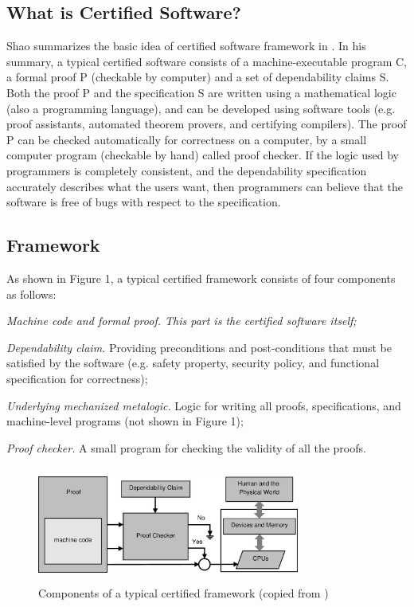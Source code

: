\documentclass[10pt, conference, compsocconf]{IEEEtran}
\begin{document}
\subsection{What is Certified Software?}

Shao summarizes the basic idea of certified software framework in \cite{shao}. In his summary, a typical certified software consists of a machine-executable program C, a formal proof P (checkable by computer) and a set of dependability claims S. Both the proof P and the specification S are written using a mathematical logic (also a programming language), and can be developed using software tools (e.g. proof assistants, automated theorem provers, and certifying compilers). The proof P can be checked automatically for correctness on a computer, by a small computer program (checkable by hand) called proof checker. If the logic used by programmers is completely consistent, and the dependability specification accurately describes what the users want, then programmers can believe that the software is free of bugs with respect to the specification.

\subsection{Framework}

As shown in Figure 1, a typical certified framework consists of four components as follows:

\emph{Machine code and formal proof. This part is the certified software itself;}

\emph{Dependability claim.} Providing preconditions and post-conditions that must be satisfied by the software (e.g. safety property, security policy, and functional specification for correctness);

\emph{Underlying mechanized metalogic.} Logic for writing all proofs, specifications, and machine-level programs (not shown in Figure 1);

\emph{Proof checker.} A small program for checking the validity of all the proofs.

	\begin{figure}[H]
	\centering
	\includegraphics[height=1.5in ,width=3.4in]{framework.eps}
	\caption{Components of a typical certified framework (copied from \cite{shao})}
	\end{figure}
\end{document}
